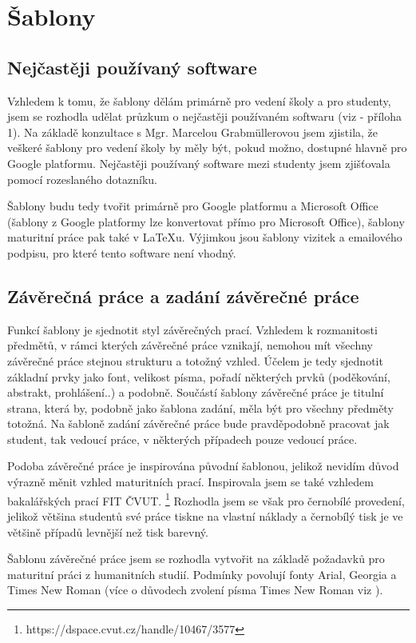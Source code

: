 \documentclass[11pt,a4paper,twoside,openright]{report}
\begin{document}
\section{Šablony}
\subsection{Nejčastěji používaný software}
Vzhledem k tomu, že šablony dělám primárně pro vedení školy a pro studenty, jsem se rozhodla udělat průzkum o nejčastěji používaném softwaru (viz  - příloha 1). Na základě konzultace s Mgr. Marcelou Grabmüllerovou jsem zjistila, že veškeré šablony pro vedení školy by měly být, pokud možno, dostupné hlavně pro Google platformu. Nejčastěji používaný software mezi studenty jsem zjišťovala pomocí rozeslaného dotazníku.

Šablony budu tedy tvořit primárně pro Google platformu a Microsoft Office (šablony z Google platformy lze konvertovat přímo pro Microsoft Office), šablony maturitní práce pak také v LaTeXu. Výjimkou jsou šablony vizitek a emailového podpisu, pro které tento software není vhodný.

\subsection{Závěrečná práce a zadání závěrečné práce}
Funkcí šablony je sjednotit styl závěrečných prací. Vzhledem k rozmanitosti předmětů, v rámci kterých závěrečné práce vznikají, nemohou mít všechny závěrečné práce stejnou strukturu a totožný vzhled. Účelem je tedy sjednotit základní prvky jako font, velikost písma, pořadí některých prvků (poděkování, abstrakt, prohlášení..) a podobně. Součástí šablony závěrečné práce je titulní strana, která by, podobně jako šablona zadání, měla být pro všechny předměty totožná.
Na šabloně zadání závěrečné práce bude pravděpodobně pracovat jak student, tak vedoucí práce, v některých případech pouze vedoucí práce.

Podoba závěrečné práce je inspirována původní šablonou, jelikož nevidím důvod výrazně měnit vzhled maturitních prací. Inspirovala jsem se také vzhledem bakalářských prací FIT ČVUT. \footnote{https://dspace.cvut.cz/handle/10467/3577} Rozhodla jsem se však pro černobílé provedení, jelikož většina studentů své práce tiskne na vlastní náklady a černobílý tisk je ve většině případů levnější než tisk barevný.

Šablonu závěrečné práce jsem se rozhodla vytvořit na základě požadavků pro maturitní práci z humanitních studií. Podmínky povolují fonty Arial, Georgia a Times New Roman (více o důvodech zvolení písma Times New Roman viz ).
\end{document}
